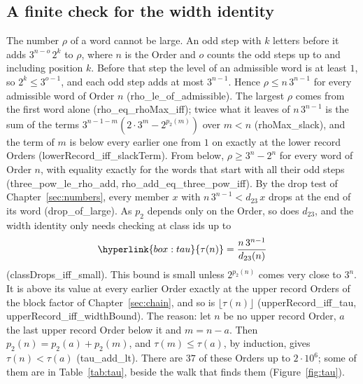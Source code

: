 \documentclass[10pt,a4paper,titlepage]{article}
\makeatletter
\newcommand{\termhere}[1]{\leavevmode
  \Hy@raisedlink{\hyper@anchorstart{term:#1}\hyper@anchorend}}
\newcommand{\keysym}[2]{\hyperlink{box:#1}{#2}}
\newcommand{\lean}[1]{\textsf{#1}}
\makeatother
\begin{document}
\subsection*{A finite check for the width identity}

The number $\rho$ of a word cannot be large. An odd step with $k$ letters before it adds
$3^{n-o}\,2^k$ to $\rho$, where $n$ is the Order and $o$ counts the odd steps up to
and including position $k$. Before that step the level of an admissible word is
at least $1$, so $2^k \le 3^{o-1}$, and each odd step adds at most $3^{n-1}$. Hence
$\rho \le n\,3^{n-1}$ for every admissible word of Order $n$
(\lean{rho\_le\_of\_admissible}). The largest $\rho$ comes from the first word alone
(\lean{rho\_eq\_rhoMax\_iff}); twice what it leaves of $n\,3^{n-1}$ is the sum of the terms
$3^{n-1-m}(2 \cdot 3^m - 2^{p_2(m)})$ over $m < n$ (\lean{rhoMax\_slack}), and the term of $m$
is below every earlier one from $1$ on exactly at the lower record Orders
(\lean{lowerRecord\_iff\_slackTerm}). From below, $\rho \ge 3^n - 2^n$ for every word of
Order $n$, with equality exactly for the words that start with all their odd steps
(\lean{three\_pow\_le\_rho\_add}, \lean{rho\_add\_eq\_three\_pow\_iff}). \termhere{tau}By the drop test of Chapter~\ref{sec:numbers},
every member $x$ with $n\,3^{n-1} < d_{23}\,x$ drops at the end of its word
(\lean{drop\_of\_large}). As $p_2$ depends only on the Order, so does $d_{23}$,
and the width identity only needs checking at class ids up to
\[
\keysym{tau}{\tau(n)} = \frac{n\,3^{n-1}}{d_{23}(n)}
\]
(\lean{classDrops\_iff\_small}). This bound is small unless $2^{p_2(n)}$ comes
very close to $3^n$. It is above its value at every earlier Order exactly at the
upper record Orders of the block factor of Chapter~\ref{sec:chain}, and so is
$\lfloor \tau(n) \rfloor$ (\lean{upperRecord\_iff\_tau},
\lean{upperRecord\_iff\_widthBound}). The reason: let $n$ be no upper record Order, $a$
the last upper record Order below it and $m = n - a$. Then $p_2(n) = p_2(a) + p_2(m)$,
and $\tau(m) \le \tau(a)$, by induction, gives $\tau(n) < \tau(a)$ (\lean{tau\_add\_lt}). There are
$37$ of these Orders up to $2\cdot 10^6$; some of them are in Table~\ref{tab:tau},
beside the walk that finds them (Figure~\ref{fig:tau}).
\end{document}
